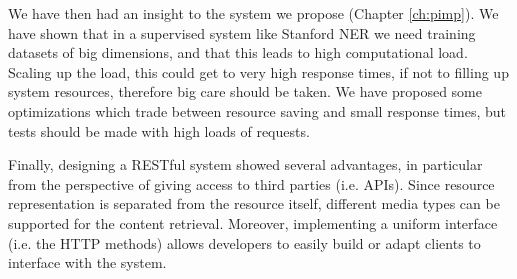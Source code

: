 \documentclass[a4paper,11pt]{report}
\begin{document}
We have then had an insight to the system we propose (Chapter \ref{ch:pimp}). We have shown that in a supervised system like Stanford NER we need training datasets of big dimensions, and that this leads to high computational load. Scaling up the load, this could get to very high response times, if not to filling up system resources, therefore big care should be taken. We have proposed some optimizations which trade between resource saving and small response times, but tests should be made with high loads of requests.

Finally, designing a RESTful system showed several advantages, in particular from the perspective of giving access to third parties (i.e. APIs). Since resource representation is separated from the resource itself, different media types can be supported for the content retrieval. Moreover, implementing a uniform interface (i.e. the HTTP methods) allows developers to easily build or adapt clients to interface with the system.
\cleardoublepage
{}

\nocite{*}
\end{document}
